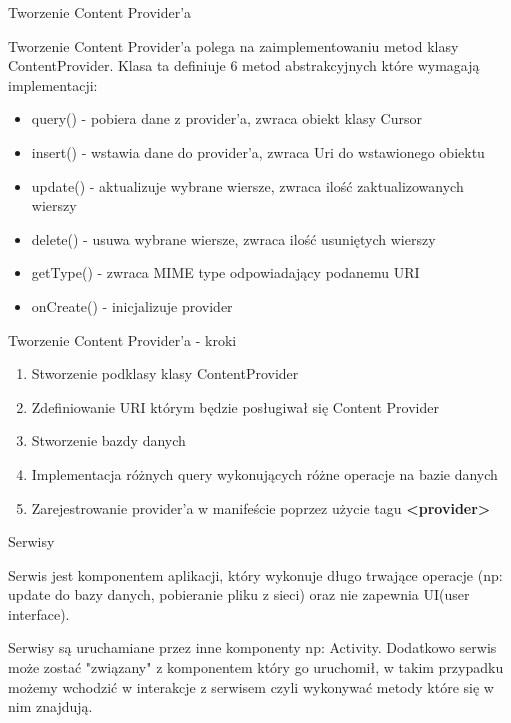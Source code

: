 \documentclass{beamer}
\begin{document}
\begin{frame}{Tworzenie Content Provider'a}
	\begin{block}{}
		Tworzenie Content Provider'a polega na zaimplementowaniu metod klasy ContentProvider. Klasa ta definiuje 6 metod abstrakcyjnych które wymagają implementacji:
		\begin{itemize}
			\item query() - pobiera dane z provider'a, zwraca obiekt klasy Cursor
			\item insert() - wstawia dane do provider'a, zwraca Uri do wstawionego obiektu
			\item update() - aktualizuje wybrane wiersze, zwraca ilość zaktualizowanych wierszy
			\item delete() - usuwa wybrane wiersze, zwraca ilość usuniętych wierszy
			\item getType() - zwraca MIME type odpowiadający podanemu URI
			\item onCreate() - inicjalizuje provider
		\end{itemize}
	\end{block}
\end{frame}

\begin{frame}{Tworzenie Content Provider'a - kroki}
	\begin{enumerate}
		\item Stworzenie podklasy klasy ContentProvider
		\item Zdefiniowanie URI którym będzie posługiwał się Content Provider
		\item Stworzenie bazdy danych
		\item Implementacja różnych query wykonujących różne operacje na bazie danych
		\item Zarejestrowanie provider'a w manifeście poprzez użycie tagu \textbf{<provider>}
	\end{enumerate}
\end{frame}

\begin{frame}{Serwisy}
	\begin{block}{}
		Serwis jest komponentem aplikacji, który wykonuje długo trwające operacje (np: update do bazy danych, pobieranie pliku z sieci) oraz nie zapewnia UI(user interface).
		
		Serwisy są uruchamiane przez inne komponenty np: Activity. Dodatkowo serwis może zostać "związany" z komponentem który go uruchomił, w takim przypadku możemy wchodzić w interakcje z serwisem czyli wykonywać metody które się w nim znajdują.
	\end{block}
\end{frame}
\end{document}
